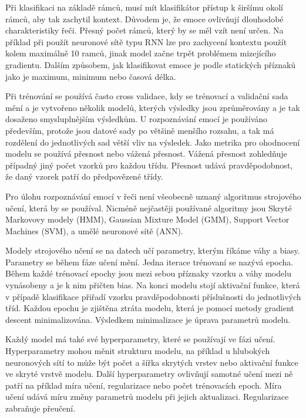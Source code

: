 \documentclass[FM,BP]{tulthesis}
\begin{document}
Při klasifikaci na základě rámců, musí mít klasifikátor přístup k širšímu okolí rámců, aby tak zachytil kontext. Důvodem je, že emoce ovlivňují dlouhodobé charakteristiky řeči. Přesný počet rámců, který by se měl vzít není určen. Na příklad při použít neuronové sítě typu RNN lze pro zachycení kontextu použít kolem maximálně 10 ramců, jinak model začne trpět problémem mizejícího gradientu. Dalším způsobem, jak klasifikovat emoce je podle statických příznaků jako je maximum, minimum nebo časová délka\cite{konar_chakraborty_2015}.

Při trénování se používá často cross validace, kdy se trénovací a validační sada mění a je vytvořeno několik modelů, kterých výsledky jsou zprůměrovány a je tak dosaženo smysluplnějším výsledkům. U rozpoznávání emocí je používáno především, protože jsou datové sady po většině menšího rozsahu, a tak má rozdělení do jednotlivých sad větší vliv na výsledek. Jako metrika pro ohodnocení modelu se používá přesnost nebo vážená přesnost. Vážená přesnost zohledňuje případný jiný počet vzorků pro každou třídu. Přesnost udává pravděpodobnost, že daný vzorek patří do předpovězené třídy\cite{konar_chakraborty_2015}.

Pro úlohu rozpoznávání emocí v řeči není všeobecně uznaný algoritmus strojového učení, která by se používal. Nicméně nejčastěji používané algoritmy jsou Skryté Markovovy modely (HMM), Gaussian Mixture Model (GMM), Support Vector Machines (SVM), a umělé neuronové sítě (ANN)\cite{DBLP:journals/speech/AkcayO20}.


Modely strojového učení se na datech učí parametry, kterým říkáme váhy a biasy. Parametry se během fáze učení mění. Jedna iterace trénovaní se nazývá epocha. Během každé trénovací epochy jsou mezi sebou příznaky vzorku a váhy modelu vynásobeny a je k nim přičten bias. Na konci modelu stojí aktivační funkce, která v případě klasifikace přiřadí vzorku pravděpodobnosti příslušnosti do jednotlivých tříd. Každou epochu je zjištěna ztráta modelu, která je pomocí metody gradient descent minimalizována. Výsledkem minimalizace je úprava parametrů modelu.

Každý model má také své hyperparametry, které se používají ve fázi učení.\cite{leonel_2019} Hyperparametry mohou měnit strukturu modelu, na příklad u hlubokých neuronových sítí to může být počet a šířka skrytých vrstev nebo aktivační funkce ve skryté vrstvě modelu. Další hyperparametry ovlivňují samotné učení mezi ně patří na příklad míra učení, regularizace nebo počet trénovacích epoch. Míra učení udává míru změny parametrů modelu při jejich aktualizaci. Regularizace zabraňuje přeučení.
\end{document}
